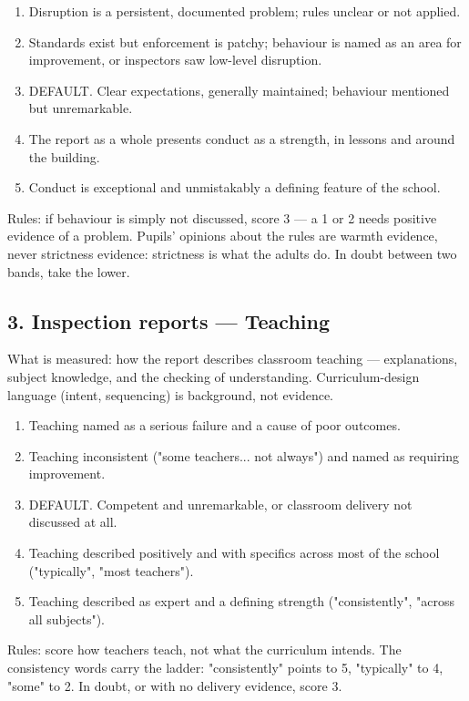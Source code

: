 \begin{enumerate}
  \item Disruption is a persistent, documented problem; rules unclear or not applied.
  \item Standards exist but enforcement is patchy; behaviour is named as an area for improvement, or inspectors saw low-level disruption.
  \item DEFAULT. Clear expectations, generally maintained; behaviour mentioned but unremarkable.
  \item The report as a whole presents conduct as a strength, in lessons and around the building.
  \item Conduct is exceptional and unmistakably a defining feature of the school.
\end{enumerate}
Rules: if behaviour is simply not discussed, score 3 --- a 1 or 2 needs positive evidence of a problem. Pupils' opinions about the rules are warmth evidence, never strictness evidence: strictness is what the adults do. In doubt between two bands, take the lower.

\subsection*{3. Inspection reports --- Teaching}
What is measured: how the report describes classroom teaching --- explanations, subject knowledge, and the checking of understanding. Curriculum-design language (intent, sequencing) is background, not evidence.

\begin{enumerate}
  \item Teaching named as a serious failure and a cause of poor outcomes.
  \item Teaching inconsistent ("some teachers... not always") and named as requiring improvement.
  \item DEFAULT. Competent and unremarkable, or classroom delivery not discussed at all.
  \item Teaching described positively and with specifics across most of the school ("typically", "most teachers").
  \item Teaching described as expert and a defining strength ("consistently", "across all subjects").
\end{enumerate}
Rules: score how teachers teach, not what the curriculum intends. The consistency words carry the ladder: "consistently" points to 5, "typically" to 4, "some" to 2. In doubt, or with no delivery evidence, score 3.

